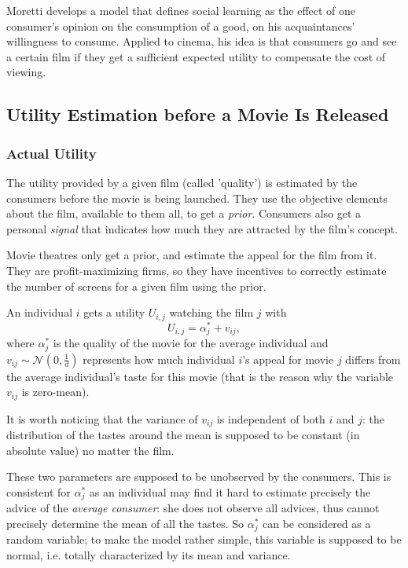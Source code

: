			Moretti develops a model that defines social learning as the effect of one consumer's opinion on the consumption of a good, on his acquaintances' willingness to consume.
			Applied to cinema, his idea is that consumers go and see a certain film if they get a sufficient expected utility to compensate the cost of viewing.
	\subsection{Utility Estimation before a Movie Is Released}	
	\subsubsection{Actual Utility}
		The utility provided by a given film (called 'quality') is estimated by the consumers before the movie is being launched. They use the objective elements about the film, available to them all, to get a \textit{prior}. Consumers also get a personal \textit{signal} that indicates how much they are attracted by the film's concept.

		Movie theatres only get a prior, and estimate the appeal for the film from it. They are profit-maximizing firms, so they have incentives to correctly estimate the number of screens for a given film using the prior.

	An individual $i$ gets a utility $U_{i,j}$ watching the film $j$ with
	\begin{equation} \label{eq:1}
	U_{i,j}=\alpha_{j}^{*}+v_{i j},
	\end{equation}
	where $\alpha_{j}^{*}$ is the quality of the movie for the average individual and $v_{i j}\sim \mathcal{N}(0,\frac{1}{d})$ represents how much individual $i$'s appeal for movie $j$ differs from the average individual's taste for this movie (that is the reason why the variable $v_{i j}$ is zero-mean).

	It is worth noticing that the variance of $v_{i j}$ is independent of both $i$ and $j$: the distribution of the tastes around the mean is supposed to be constant (in absolute value) no matter the film.
	
	These two parameters are supposed to be unobserved by the consumers. This is consistent for $\alpha_{j}^{*}$ as an individual may find it hard to estimate precisely the advice of the \textit{average consumer}: she does not observe all advices, thus cannot precisely determine the mean of all the tastes. So $\alpha_{j}^{*}$ can be considered as a random variable; to make the model rather simple, this variable is supposed to be normal, i.e. totally characterized by its mean and variance.
	

